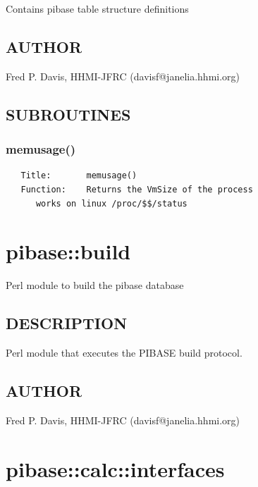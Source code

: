 \documentclass{article}
\begin{document}
Contains pibase table structure definitions

\subsection*{AUTHOR\label{pibase::benchmark_AUTHOR}}


Fred P. Davis, HHMI-JFRC (davisf@janelia.hhmi.org)

\subsection*{SUBROUTINES\label{pibase::benchmark_SUBROUTINES}}
\subsubsection*{memusage()\label{pibase::benchmark_memusage_}}
\begin{verbatim}
   Title:       memusage()
   Function:    Returns the VmSize of the process
      works on linux /proc/$$/status
\end{verbatim}
\clearpage
\section{pibase::build\label{pibase::build}}


Perl module to build the pibase database

\subsection*{DESCRIPTION\label{pibase::build_DESCRIPTION}}


Perl module that executes the PIBASE build protocol.

\subsection*{AUTHOR\label{pibase::build_AUTHOR}}


Fred P. Davis, HHMI-JFRC (davisf@janelia.hhmi.org)

\clearpage
\section{pibase::calc::interfaces\label{pibase::calc::interfaces}}
\end{document}
